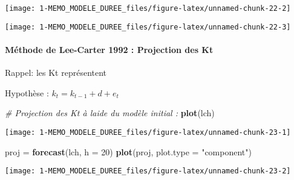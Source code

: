 \documentclass[
]{article}
\newenvironment{Shaded}{\begin{snugshade}}{\end{snugshade}}
\newcommand{\AttributeTok}[1]{\textcolor[rgb]{0.13,0.29,0.53}{#1}}
\newcommand{\CommentTok}[1]{\textcolor[rgb]{0.56,0.35,0.01}{\textit{#1}}}
\newcommand{\DecValTok}[1]{\textcolor[rgb]{0.00,0.00,0.81}{#1}}
\newcommand{\FunctionTok}[1]{\textcolor[rgb]{0.13,0.29,0.53}{\textbf{#1}}}
\newcommand{\NormalTok}[1]{#1}
\newcommand{\OtherTok}[1]{\textcolor[rgb]{0.56,0.35,0.01}{#1}}
\newcommand{\SpecialCharTok}[1]{\textcolor[rgb]{0.81,0.36,0.00}{\textbf{#1}}}
\newcommand{\StringTok}[1]{\textcolor[rgb]{0.31,0.60,0.02}{#1}}
\begin{document}
\begin{center}\texttt{[image: 1-MEMO\_MODELE\_DUREE\_files/figure-latex/unnamed-chunk-22-2]} \end{center}

\begin{Shaded}
\end{Shaded}

\begin{center}\texttt{[image: 1-MEMO\_MODELE\_DUREE\_files/figure-latex/unnamed-chunk-22-3]} \end{center}

\hypertarget{muxe9thode-de-lee-carter-1992-projection-des-kt}{%
\paragraph{Méthode de Lee-Carter 1992 : Projection des
Kt}\label{muxe9thode-de-lee-carter-1992-projection-des-kt}}

Rappel: les Kt représentent

Hypothèse : \(k_t = k_{t-1}+ d + e_t\)

\begin{Shaded}
\begin{Highlighting}[]
\CommentTok{\# Projection des Kt à l\textquotesingle{}aide du modèle initial : }
\FunctionTok{plot}\NormalTok{(lch)}
\end{Highlighting}
\end{Shaded}

\begin{center}\texttt{[image: 1-MEMO\_MODELE\_DUREE\_files/figure-latex/unnamed-chunk-23-1]} \end{center}

\begin{Shaded}
\begin{Highlighting}[]
\NormalTok{proj }\OtherTok{=} \FunctionTok{forecast}\NormalTok{(lch, }\AttributeTok{h =} \DecValTok{20}\NormalTok{)}
\FunctionTok{plot}\NormalTok{(proj, }\AttributeTok{plot.type =} \StringTok{"component"}\NormalTok{)}
\end{Highlighting}
\end{Shaded}

\begin{center}\texttt{[image: 1-MEMO\_MODELE\_DUREE\_files/figure-latex/unnamed-chunk-23-2]} \end{center}
\end{document}
